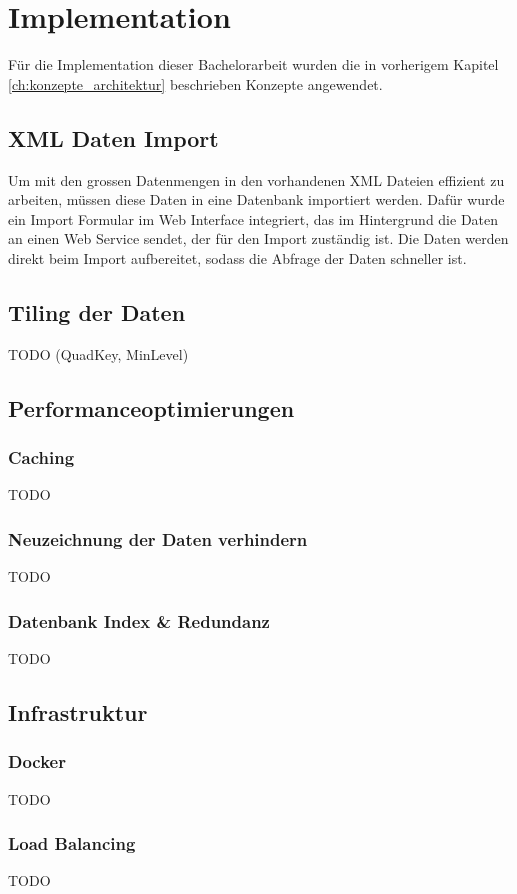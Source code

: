\chapter{Implementation}
Für die Implementation dieser Bachelorarbeit wurden die in vorherigem Kapitel \ref{ch:konzepte_architektur} beschrieben Konzepte angewendet.
\section{XML Daten Import}
Um mit den grossen Datenmengen in den vorhandenen XML Dateien effizient zu arbeiten, müssen diese Daten in eine Datenbank importiert werden. Dafür wurde ein Import Formular im Web Interface integriert, das im Hintergrund die Daten an einen Web Service sendet, der für den Import zuständig ist. Die Daten werden direkt beim Import aufbereitet, sodass die Abfrage der Daten schneller ist.\\

\section{Tiling der Daten}
\label{sec:tilingdataimplementation}
TODO (QuadKey, MinLevel)
\section{Performanceoptimierungen}
\subsection{Caching}
TODO
\subsection{Neuzeichnung der Daten verhindern}
TODO
\subsection{Datenbank Index \& Redundanz}
TODO
\section{Infrastruktur}
\subsection{Docker}
TODO
\subsection{Load Balancing}
TODO
